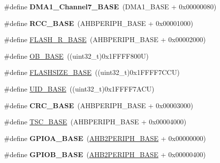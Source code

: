 \begin{DoxyCompactItemize}
\#define {\bfseries D\+M\+A1\+\_\+\+Channel7\+\_\+\+B\+A\+SE}~(D\+M\+A1\+\_\+\+B\+A\+SE + 0x00000080)
\item 
\mbox{\label{group___peripheral__memory__map_ga0e681b03f364532055d88f63fec0d99d}} 
\#define {\bfseries R\+C\+C\+\_\+\+B\+A\+SE}~(A\+H\+B\+P\+E\+R\+I\+P\+H\+\_\+\+B\+A\+SE + 0x00001000)
\item 
\#define \hyperlink{group___peripheral__memory__map_ga8e21f4845015730c5731763169ec0e9b}{F\+L\+A\+S\+H\+\_\+\+R\+\_\+\+B\+A\+SE}~(A\+H\+B\+P\+E\+R\+I\+P\+H\+\_\+\+B\+A\+SE + 0x00002000)
\item 
\#define \hyperlink{group___peripheral__memory__map_gab5b5fb155f9ee15dfb6d757da1adc926}{O\+B\+\_\+\+B\+A\+SE}~((uint32\+\_\+t)0x1\+F\+F\+F\+F800\+U)
\item 
\#define \hyperlink{group___peripheral__memory__map_ga776d985f2d4d40b588ef6ca9d573af78}{F\+L\+A\+S\+H\+S\+I\+Z\+E\+\_\+\+B\+A\+SE}~((uint32\+\_\+t)0x1\+F\+F\+F\+F7\+C\+C\+U)
\item 
\#define \hyperlink{group___peripheral__memory__map_ga664eda42b83c919b153b07b23348be67}{U\+I\+D\+\_\+\+B\+A\+SE}~((uint32\+\_\+t)0x1\+F\+F\+F\+F7\+A\+C\+U)
\item 
\mbox{\label{group___peripheral__memory__map_ga656a447589e785594cbf2f45c835ad7e}} 
\#define {\bfseries C\+R\+C\+\_\+\+B\+A\+SE}~(A\+H\+B\+P\+E\+R\+I\+P\+H\+\_\+\+B\+A\+SE + 0x00003000)
\item 
\#define \hyperlink{group___peripheral__memory__map_ga2bba7a31caeacaacd433abb71781e0af}{T\+S\+C\+\_\+\+B\+A\+SE}~(A\+H\+B\+P\+E\+R\+I\+P\+H\+\_\+\+B\+A\+SE + 0x00004000)
\item 
\mbox{\label{group___peripheral__memory__map_gad7723846cc5db8e43a44d78cf21f6efa}} 
\#define {\bfseries G\+P\+I\+O\+A\+\_\+\+B\+A\+SE}~(\hyperlink{group___peripheral__memory__map_gaeedaa71d22a1948492365e2cd26cfd46}{A\+H\+B2\+P\+E\+R\+I\+P\+H\+\_\+\+B\+A\+SE} + 0x00000000)
\item 
\mbox{\label{group___peripheral__memory__map_gac944a89eb789000ece920c0f89cb6a68}} 
\#define {\bfseries G\+P\+I\+O\+B\+\_\+\+B\+A\+SE}~(\hyperlink{group___peripheral__memory__map_gaeedaa71d22a1948492365e2cd26cfd46}{A\+H\+B2\+P\+E\+R\+I\+P\+H\+\_\+\+B\+A\+SE} + 0x00000400)
\item 

\end{DoxyCompactItemize}

